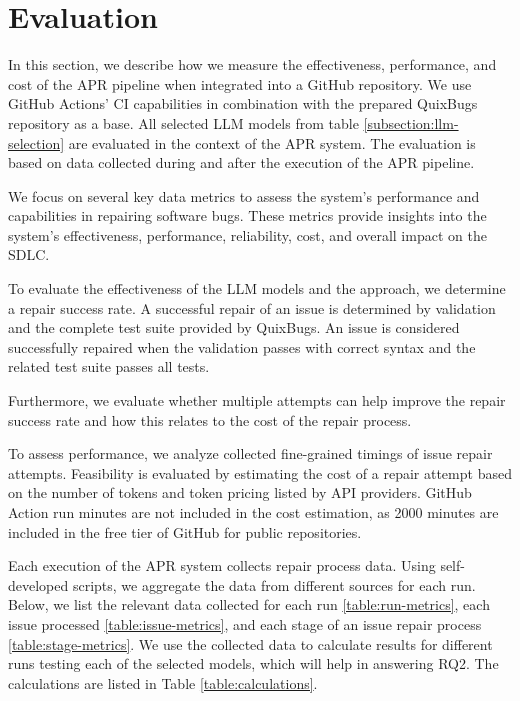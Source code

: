 \section{Evaluation} \label{section:evaluation}
In this section, we describe how we measure the effectiveness, performance, and cost of the APR pipeline when integrated into a GitHub repository. We use GitHub Actions' \ac{CI} capabilities in combination with the prepared QuixBugs repository as a base. All selected LLM models from table \ref{subsection:llm-selection} are evaluated in the context of the APR system. The evaluation is based on data collected during and after the execution of the APR pipeline.

We focus on several key data metrics to assess the system's performance and capabilities in repairing software bugs. These metrics provide insights into the system's effectiveness, performance, reliability, cost, and overall impact on the \ac{SDLC}.

To evaluate the effectiveness of the LLM models and the approach, we determine a repair success rate. A successful repair of an issue is determined by validation and the complete test suite provided by QuixBugs. An issue is considered successfully repaired when the validation passes with correct syntax and the related test suite passes all tests.

Furthermore, we evaluate whether multiple attempts can help improve the repair success rate and how this relates to the cost of the repair process.

To assess performance, we analyze collected fine-grained timings of issue repair attempts. Feasibility is evaluated by estimating the cost of a repair attempt based on the number of tokens and token pricing listed by API providers. GitHub Action run minutes are not included in the cost estimation, as 2000 minutes are included in the free tier of GitHub for public repositories.

Each execution of the APR system collects repair process data. Using self-developed scripts, we aggregate the data from different sources for each run. Below, we list the relevant data collected for each run \ref{table:run-metrics}, each issue processed \ref{table:issue-metrics}, and each stage of an issue repair process \ref{table:stage-metrics}. We use the collected data to calculate results for different runs testing each of the selected models, which will help in answering RQ2. The calculations are listed in Table \ref{table:calculations}.

